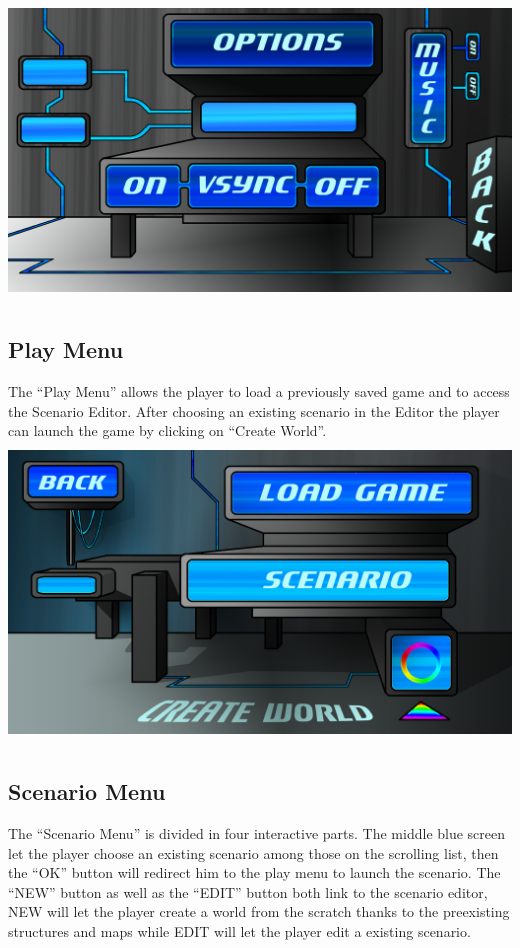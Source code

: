 \documentclass[article]{report}         %
\begin{document}
    \includegraphics[width=15cm, height=8cm]{images/Menus/Menu_Options_normal.png}

		\subsection{Play Menu}
    The ``Play Menu'' allows the player to load a previously saved game and to access the Scenario Editor. After choosing an existing scenario in the Editor the player can launch the game by clicking on ``Create World''. \\

    \includegraphics[width=15cm, height=8cm]{images/Menus/menu_play_normal.png}

    \newpage
		\subsection{Scenario Menu}
    The ``Scenario Menu'' is divided in four interactive parts. The middle blue screen let the player choose an existing scenario among those on the scrolling list, then the ``OK'' button will redirect him to the play menu to launch the scenario. The ``NEW'' button as well as the ``EDIT'' button both link to the scenario editor, NEW will let the player create a world from the scratch thanks to the preexisting structures and maps while EDIT will let the player edit a existing scenario.\\
\end{document}
